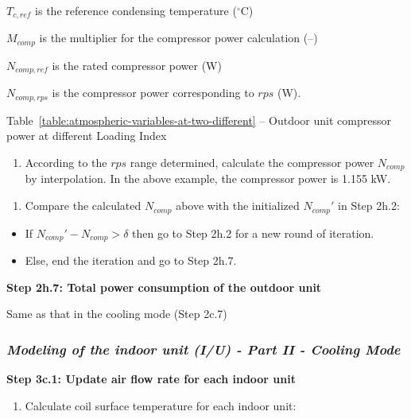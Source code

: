 \(T_{c,ref}\) is the reference condensing temperature (\(^{\circ}\)C)

\(M_{comp}\) is the multiplier for the compressor power calculation (--)

\(N_{comp,ref}\) is the rated compressor power (W)

\(N_{comp,rps}\) is the compressor power corresponding to \(rps\) (W).

Table~\ref{table:atmospheric-variables-at-two-different} -- Outdoor unit compressor power at different Loading Index

\begin{enumerate}
\def\labelenumi{\alph{enumi}.}
\setcounter{enumi}{1}
\tightlist
\item
  According to the \(rps\) range determined, calculate the compressor power \(N_{comp}\) by interpolation. In the above example, the compressor power is 1.155 kW. 
\end{enumerate}

\begin{enumerate}
\def\labelenumi{(\arabic{enumi})}
\setcounter{enumi}{1}
\tightlist
\item
  Compare the calculated \(N_{comp}\) above with the initialized \({N_{comp}}'\) in Step 2h.2:
\end{enumerate}

\begin{itemize}
\item
  If \({N_{comp}}'-N_{comp}>\delta\) then go to Step 2h.2 for a new round of iteration.
\item
  Else, end the iteration and go to Step 2h.7.
\end{itemize}

\textbf{Step 2h.7: Total power consumption of the outdoor unit}

Same as that in the cooling mode (Step 2c.7)

\subsubsection{\emph{Modeling of the indoor unit (I/U) - Part II - Cooling Mode}}\label{modeling-of-the-indoor-unit-iu---part-ii---cooling-mode}

\textbf{Step 3c.1: Update air flow rate for each indoor unit}

\begin{enumerate}
\def\labelenumi{(\arabic{enumi})}
\tightlist
\item
  Calculate coil surface temperature for each indoor unit:
\end{enumerate}

